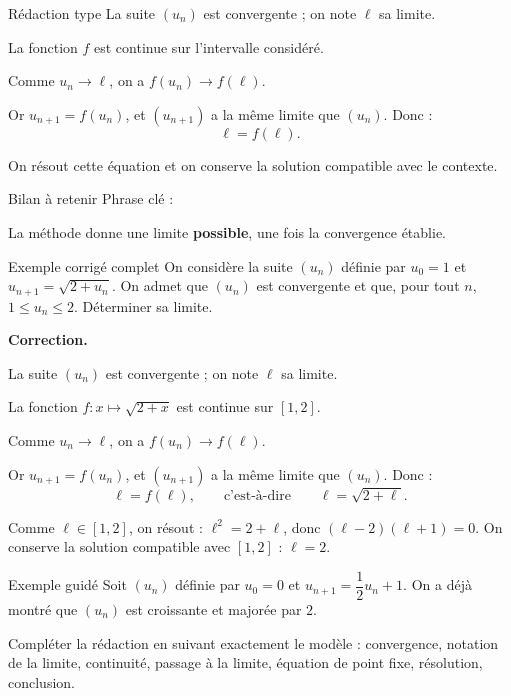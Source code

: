\documentclass[10pt,a4paper]{article}
\newcommand{\ligne}{\vspace{3.5pt}}
\begin{document}
\hfill
\begin{minipage}[t]{0.49\textwidth}
\begin{boite}{Rédaction type}
La suite \((u_n)\) est convergente ; on note \(\ell\) sa limite.

La fonction \(f\) est continue sur l'intervalle considéré.

Comme \(u_n\to\ell\), on a \(f(u_n)\to f(\ell)\).

\ligne
Or \(u_{n+1}=f(u_n)\), et \((u_{n+1})\) a la même limite que \((u_n)\). Donc :
\[
\ell=f(\ell).
\]

On résout cette équation et on conserve la solution compatible avec le contexte.
\end{boite}

\begin{boite}{Bilan à retenir}
Phrase clé :

\begin{center}
\end{center}

La méthode donne une limite \textbf{possible}, une fois la convergence établie.
\end{boite}
\end{minipage}

\begin{boite}{Exemple corrigé complet}
On considère la suite \((u_n)\) définie par \(u_0=1\) et \(u_{n+1}=\sqrt{2+u_n}\). On admet que \((u_n)\) est convergente et que, pour tout \(n\), \(1\leq u_n\leq 2\). Déterminer sa limite.

\textbf{Correction.}

\ligne
La suite \((u_n)\) est convergente ; on note \(\ell\) sa limite.

La fonction \(f:x\mapsto\sqrt{2+x}\) est continue sur \([1,2]\).

\ligne
Comme \(u_n\to\ell\), on a \(f(u_n)\to f(\ell)\).

\ligne
Or \(u_{n+1}=f(u_n)\), et \((u_{n+1})\) a la même limite que \((u_n)\). Donc :
\[
\ell=f(\ell),\qquad \text{c'est-à-dire}\qquad \ell=\sqrt{2+\ell}.
\]

\ligne
Comme \(\ell\in[1,2]\), on résout : \(\ell^2=2+\ell\), donc \((\ell-2)(\ell+1)=0\). On conserve la solution compatible avec \([1,2]\) : \(\boxed{\ell=2}\).
\end{boite}

\begin{boite}{Exemple guidé}
Soit \((u_n)\) définie par \(u_0=0\) et \(u_{n+1}=\dfrac12u_n+1\). On a déjà montré que \((u_n)\) est croissante et majorée par \(2\).

Compléter la rédaction en suivant exactement le modèle : convergence, notation de la limite, continuité, passage à la limite, équation de point fixe, résolution, conclusion.
\end{boite}
\end{document}
